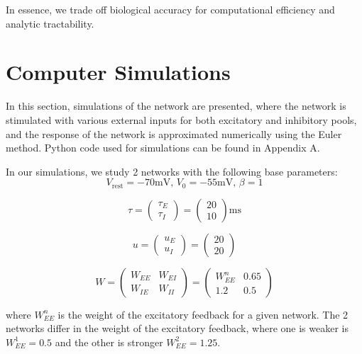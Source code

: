 \documentclass[10pt,twocolumn]{article}
\begin{document}
In essence, we trade off biological accuracy for
computational efficiency and analytic tractability.



\section{Computer Simulations}
In this section, simulations of the network are presented,
where the network is stimulated with various external inputs for
both excitatory and inhibitory pools, and the
response of the network is approximated numerically using the Euler method.
Python code used for simulations can be found in Appendix A.

In our simulations, we study 2 networks with the following base parameters:
$$
    V_{\text{rest}} = -70 \text{mV, } V_0 = -55 \text{mV, } \beta = 1
$$

$$
    \tau
    = \begin{pmatrix} \tau_E \\ \tau_I \end{pmatrix}
    = \begin{pmatrix} 20 \\ 10 \end{pmatrix}\text{ms}
$$

$$
    u
    = \begin{pmatrix} u_E \\ u_I \end{pmatrix}
    = \begin{pmatrix} 20 \\ 20 \end{pmatrix}
$$

$$
    W
    = \begin{pmatrix} W_{EE} & W_{EI} \\ W_{IE} & W_{II} \end{pmatrix}
    = \begin{pmatrix} W^n_{EE} & 0.65 \\ 1.2 & 0.5 \end{pmatrix}
$$

where $W^n_{EE}$ is the weight of the excitatory feedback for a given network.
The 2 networks differ in the weight of the excitatory feedback, where one is weaker
is $W^1_{EE} = 0.5$ and the other is stronger $W^2_{EE} = 1.25$.
\end{document}
